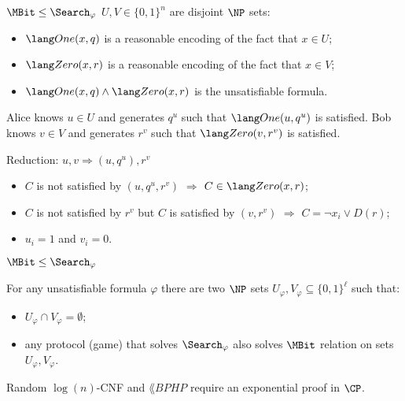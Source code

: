 \begin{frame}{$\MBit \le \Search_{\varphi}$}
    $U, V \in \{0, 1\}^n$ are disjoint $\NP$ sets:
    \begin{itemize}
        \item $\One(x, q)$ is a reasonable encoding of the fact that $x \in U$;
        \item $\Zero(x, r)$ is a reasonable encoding of the fact that $x \in V$;
        \item $\One(x, q) \land \Zero(x, r)$ is the unsatisfiable formula.            
    \end{itemize}

    \vspace{0.2cm}
    \pause
    Alice knows $u \in U$ and generates $q^u$ such that $\One(u, q^u)$ is satisfied. Bob knows $v \in
    V$ and generates $r^v$ such that $\Zero(v, r^v)$ is satisfied.

    \vspace{0.2cm}
    Reduction: $u, v \Rightarrow (u, q^u), r^v$ 

	\pause
    
    \begin{itemize}
        \item $C$ is not satisfied by $(u, q^u, r^v)$ $\Rightarrow$ $C \in \Zero(x, r)$;
        \pause
        \item $C$ is not satisfied by $r^v$ but $C$ is satisfied by $(v, r^v)$ $\Rightarrow$ $C = \neg
            x_i \lor D(r)$;
        \pause
        \item $u_i = 1$ and $v_i = 0$.   
    \end{itemize}
\end{frame}


\begin{frame}{$\MBit \le \Search_{\varphi}$}

    \begin{theorem}
        For any unsatisfiable formula $\varphi$ there are two $\NP$ sets $U_{\varphi}, V_{\varphi}
        \subseteq \{0, 1\}^{\ell}$ such that:
        \begin{itemize}
            \item $U_{\varphi} \cap V_{\varphi} = \emptyset$;
            \item any protocol (game) that solves $\Search_{\varphi}$ also solves $\MBit$ relation on
                sets $U_{\varphi}, V_{\varphi}$.
        \end{itemize}
    \end{theorem}

    \begin{corollary}
        Random $\log(n)$-CNF and $\lang{BPHP}$ require an exponential proof in $\CP$.
    \end{corollary}
\end{frame}


